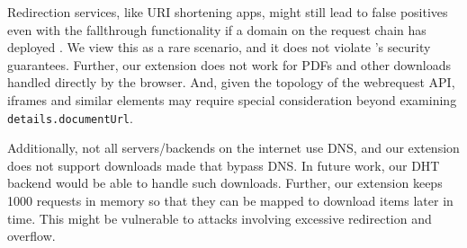 Redirection services, like URI shortening apps, might still lead to false
positives even with the fallthrough functionality if a domain on the request
chain has deployed \SYSTEM{}. We view this as a rare scenario, and it does not
violate \SYSTEM{}'s security guarantees. Further, our extension does not work
for PDFs and other downloads handled directly by the browser. And, given the
topology of the webrequest API, iframes and similar elements may require special
consideration beyond examining \texttt{details.documentUrl}.

Additionally, not all servers/backends on the internet use DNS, and our
extension does not support downloads made that bypass DNS. In future work, our
DHT backend would be able to handle such downloads. Further, our extension keeps
1000 requests in memory so that they can be mapped to download items later in
time. This might be vulnerable to attacks involving excessive redirection and
overflow.
